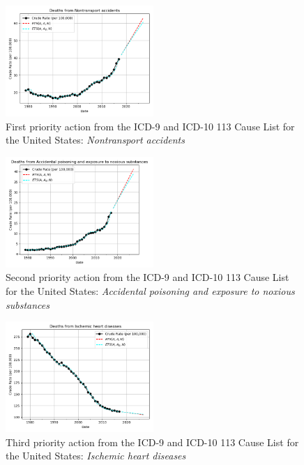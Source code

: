 \documentclass[10pt, a4paper, twocolumn]{IEEEconf}
\begin{document}
\begin{figure}[H]
  \centering
  \includegraphics[width=0.5\textwidth]{results/US_ICD_113_SELECTED_CAUSES_LEAVES/Nontransport_accidents_ets.png}
  \caption{First priority action from the ICD-9 and ICD-10 113 Cause List for the United States: \textit{Nontransport accidents}}\label{fig:k2a}
\end{figure}

\begin{figure}[H]
  \centering
  \includegraphics[width=0.5\textwidth]{results/US_ICD_113_SELECTED_CAUSES_LEAVES/Accidental_poisoning_and_exposure_to_noxious_substances_ets.png}
  \caption{Second priority action from the ICD-9 and ICD-10 113 Cause List for the United States: \textit{Accidental poisoning and exposure to noxious substances}}\label{fig:k2b}
\end{figure}

\begin{figure}[H]
  \centering
  \includegraphics[width=0.5\textwidth]{results/US_ICD_113_SELECTED_CAUSES_LEAVES/Ischemic_heart_diseases_ets.png}
  \caption{Third priority action from the ICD-9 and ICD-10 113 Cause List for the United States: \textit{Ischemic heart diseases}}\label{fig:k2c}
\end{figure}
\end{document}
